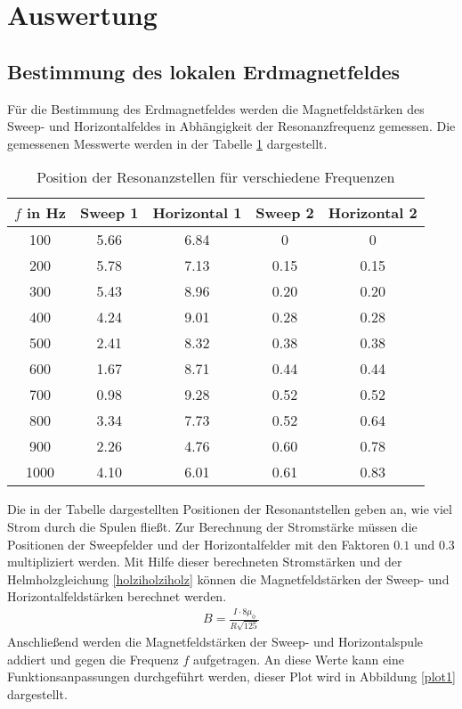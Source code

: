 \section{Auswertung}
\label{sec:Auswertung}
\subsection{Bestimmung des lokalen Erdmagnetfeldes}
Für die Bestimmung des Erdmagnetfeldes werden die Magnetfeldstärken des
Sweep- und Horizontalfeldes in Abhängigkeit der Resonanzfrequenz gemessen.
Die gemessenen Messwerte werden in der Tabelle \ref{tabmess1} dargestellt.
 \begin{table}
   \centering
   \caption{Position der Resonanzstellen für verschiedene Frequenzen}
   \label{tabmess1}
   \begin{tabular}{c|c|c|c|c}
     \toprule
    $f$ in Hz & Sweep 1& Horizontal 1 & Sweep 2&Horizontal 2 \\
     \midrule
     100 &  5.66 &  6.84  & 0   &   0   \\
     200 &  5.78 & 7.13  & 0.15 &  0.15  \\
     300 &  5.43 & 8.96  & 0.20 &  0.20 \\
     400 &  4.24 & 9.01  & 0.28 &  0.28 \\
     500 &  2.41 & 8.32  & 0.38 &  0.38 \\
     600 &  1.67 & 8.71  & 0.44 &  0.44 \\
     700 &  0.98 & 9.28  & 0.52 &  0.52 \\
     800 &  3.34 & 7.73  & 0.52 &  0.64 \\
     900 &  2.26 & 4.76  & 0.60 &  0.78 \\
     1000 & 4.10 & 6.01  & 0.61 &  0.83 \\
     \bottomrule
   \end{tabular}
 \end{table}
Die in der Tabelle dargestellten Positionen der Resonantstellen geben an, wie
viel Strom durch die Spulen fließt. Zur Berechnung der Stromstärke müssen
die Positionen der Sweepfelder und der Horizontalfelder mit den Faktoren
$0.1$ und $0.3$ multipliziert werden. Mit Hilfe dieser berechneten Stromstärken
und der Helmholzgleichung \eqref{holziholziholz} können die Magnetfeldstärken der Sweep- und
Horizontalfeldstärken berechnet werden.
\begin{align}
\label{holziholziholz}
B=\frac{I\cdot 8\mu_0}{R\sqrt{125}}
\end{align}
Anschließend werden die Magnetfeldstärken der Sweep- und Horizontalspule addiert
und gegen die Frequenz $f$ aufgetragen. An diese Werte kann eine
Funktionsanpassungen durchgeführt werden, dieser Plot wird in Abbildung
\ref{plot1} dargestellt.

